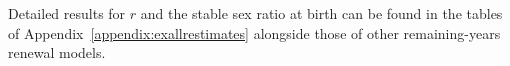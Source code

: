 Detailed results for $r$ and
the stable sex ratio at birth can be found in the tables of
Appendix~\ref{appendix:exallrestimates} alongside those of other remaining-years renewal models.